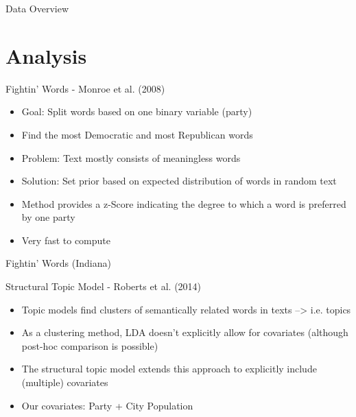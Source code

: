 \documentclass[12pt]{beamer}
\begin{document}
\begin{frame}{Data Overview}


\end{frame}

\section{Analysis}


\begin{frame}{Fightin' Words - Monroe et al. (2008)}
\linespread{1.5}
\begin{itemize}
	\item Goal: Split words based on one binary variable (party)
	\item Find the most Democratic and most Republican words
	\item Problem: Text mostly consists of meaningless words
	\item Solution: Set prior based on expected distribution of words in random text
	\item Method provides a z-Score indicating the degree to which a word is preferred by one party
	\item Very fast to compute
\end{itemize}
\end{frame}

\begin{frame}{Fightin' Words (Indiana)}
	
%	
\end{frame}

%

\begin{frame}{Structural Topic Model - Roberts et al. (2014)}
\linespread{1.5}
\begin{itemize}
	\item Topic models find clusters of semantically related words in texts --> i.e. topics
	\item As a clustering method, LDA doesn't explicitly allow for covariates (although post-hoc comparison is possible)
	\item The structural topic model extends this approach to explicitly include (multiple) covariates
	\item Our covariates: Party + City Population
\end{itemize}
\end{frame}
\end{document}

